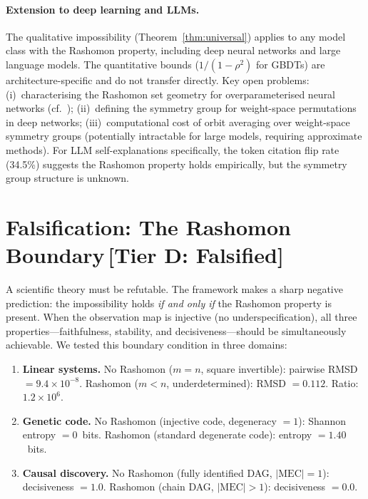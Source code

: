\documentclass[11pt,a4paper]{article}
\begin{document}
\paragraph{Extension to deep learning and LLMs.}
The qualitative impossibility (Theorem~\ref{thm:universal}) applies to any model class with the Rashomon property, including deep neural networks and large language models. The quantitative bounds ($1/(1{-}\rho^2)$ for GBDTs) are architecture-specific and do not transfer directly. Key open problems: (i)~characterising the Rashomon set geometry for overparameterised neural networks (cf.~\citet{damour2022underspecification}); (ii)~defining the symmetry group for weight-space permutations in deep networks; (iii)~computational cost of orbit averaging over weight-space symmetry groups (potentially intractable for large models, requiring approximate methods). For LLM self-explanations specifically, the token citation flip rate (34.5\%) suggests the Rashomon property holds empirically, but the symmetry group structure is unknown.

\section{Falsification: The Rashomon Boundary\,\textnormal{\normalsize[Tier D: Falsified]}}
\label{sec:falsification}

A scientific theory must be refutable.  The framework makes a sharp negative
prediction: the impossibility holds \emph{if and only if} the Rashomon property
is present.  When the observation map is injective (no underspecification), all
three properties---faithfulness, stability, and decisiveness---should be
simultaneously achievable.  We tested this boundary condition in three domains:

\begin{enumerate}
  \item \textbf{Linear systems.}  No Rashomon ($m = n$, square invertible):
        pairwise RMSD $= 9.4 \times 10^{-8}$.  Rashomon ($m < n$,
        underdetermined): RMSD $= 0.112$.  Ratio: $1.2 \times 10^6$.
  \item \textbf{Genetic code.}  No Rashomon (injective code, degeneracy $= 1$):
        Shannon entropy $= 0$~bits.  Rashomon (standard degenerate code):
        entropy $= 1.40$~bits.
  \item \textbf{Causal discovery.}  No Rashomon (fully identified DAG,
        $|\mathrm{MEC}| = 1$): decisiveness $= 1.0$.  Rashomon (chain DAG,
        $|\mathrm{MEC}| > 1$): decisiveness $= 0.0$.
\end{enumerate}
\end{document}
